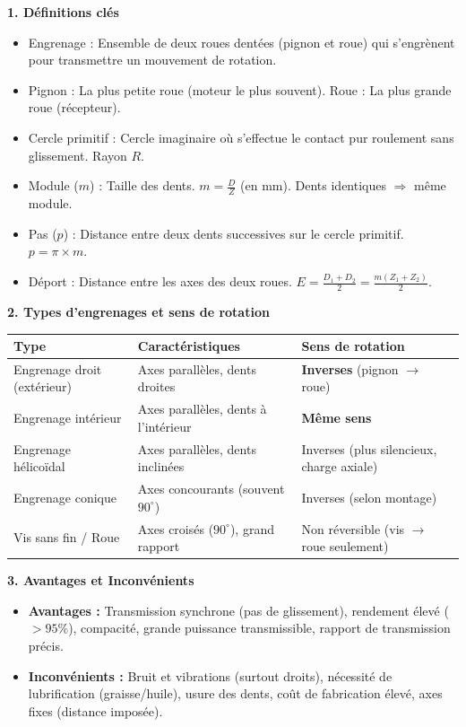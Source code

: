 \documentclass[11pt]{article}
\newcommand{\cle}[1]{{\popxbold\color{popdark}#1}}
\begin{document}
\begin{bilan}

\textbf{1. Définitions clés}
\begin{itemize}
  \item \cle{Engrenage} : Ensemble de deux roues dentées (pignon et roue) qui s'engrènent pour transmettre un mouvement de rotation.
  \item \cle{Pignon} : La plus petite roue (moteur le plus souvent). \cle{Roue} : La plus grande roue (récepteur).
  \item \cle{Cercle primitif} : Cercle imaginaire où s'effectue le contact pur roulement sans glissement. Rayon $R$.
  \item \cle{Module} ($m$) : Taille des dents. $m = \frac{D}{Z}$ (en mm). Dents identiques $\Rightarrow$ même module.
  \item \cle{Pas} ($p$) : Distance entre deux dents successives sur le cercle primitif. $p = \pi \times m$.
  \item \cle{Déport} : Distance entre les axes des deux roues. $E = \frac{D_1 + D_2}{2} = \frac{m(Z_1+Z_2)}{2}$.
\end{itemize}

\textbf{2. Types d'engrenages et sens de rotation}
\begin{center}
\begin{tabularx}{\linewidth}{|l|X|X|}\hline
\rowcolor{popblueL}
\textbf{Type} & \textbf{Caractéristiques} & \textbf{Sens de rotation} \\ \hline
Engrenage droit (extérieur) & Axes parallèles, dents droites & \textbf{Inverses} (pignon $\rightarrow$ roue) \\ \hline
Engrenage intérieur & Axes parallèles, dents à l'intérieur & \textbf{Même sens} \\ \hline
Engrenage hélicoïdal & Axes parallèles, dents inclinées & Inverses (plus silencieux, charge axiale) \\ \hline
Engrenage conique & Axes concourants (souvent $90^\circ$) & Inverses (selon montage) \\ \hline
Vis sans fin / Roue & Axes croisés ($90^\circ$), grand rapport & Non réversible (vis $\rightarrow$ roue seulement) \\ \hline
\end{tabularx}
\end{center}

\textbf{3. Avantages et Inconvénients}
\begin{itemize}
  \item \textbf{Avantages :} Transmission synchrone (pas de glissement), rendement élevé ($> 95\%$), compacité, grande puissance transmissible, rapport de transmission précis.
  \item \textbf{Inconvénients :} Bruit et vibrations (surtout droits), nécessité de lubrification (graisse/huile), usure des dents, coût de fabrication élevé, axes fixes (distance imposée).
\end{itemize}


\end{bilan}
\end{document}
